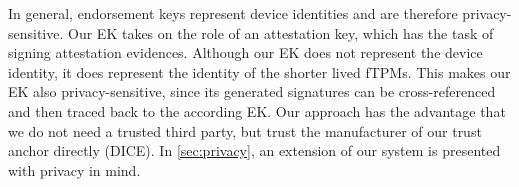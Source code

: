 

In general, endorsement keys represent device identities and are therefore privacy-sensitive.
Our EK takes on the role of an attestation key, which has the task of signing attestation evidences.
Although our EK does not represent the device identity, it does represent the identity of the shorter lived fTPMs.
This makes our EK also privacy-sensitive, since its generated signatures can be cross-referenced and then traced back to the according EK.
Our approach has the advantage that we do not need a trusted third party, but trust the manufacturer of our trust anchor directly (DICE).
In \autoref{sec:privacy}, an extension of our system is presented with privacy in mind.
